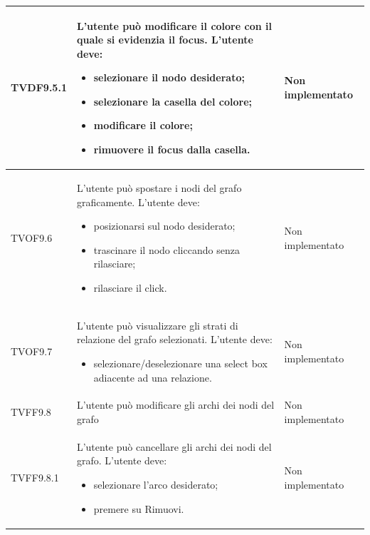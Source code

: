 \documentclass[openany,12pt,a4paper]{report}
\begin{document}
\begin{longtable}{| p{3cm} |p{8cm} | p{2.5cm} |}
	\newline TVDF9.5.1&
	\newline L'utente può modificare il colore con il quale si evidenzia il focus. L'utente deve:
	\begin{itemize}
		\item selezionare il nodo desiderato;
		\item selezionare la casella del colore;
		\item modificare il colore;
		\item rimuovere il focus dalla casella.
	\end{itemize}&
	\newline Non implementato
	\\[1em]
	\hline
	
	\newline TVOF9.6&
	\newline L'utente può spostare i nodi del grafo graficamente. L'utente deve:
	\begin{itemize}
		\item posizionarsi sul nodo desiderato;
		\item trascinare il nodo cliccando senza rilasciare;
		\item rilasciare il click.
	\end{itemize}&
	\newline Non implementato
	\\[1em]
	\hline
	
	\newline TVOF9.7&
	\newline L'utente può visualizzare gli strati di relazione del grafo selezionati. L'utente deve:
	\begin{itemize}
		\item selezionare/deselezionare una select box adiacente ad una relazione.
	\end{itemize}&
	\newline Non implementato
	\\[1em]
	\hline
	
	\newline TVFF9.8&
	\newline L'utente può modificare gli archi dei nodi del grafo&
	\newline Non implementato
	\\[1em]
	\hline
	
	\newline TVFF9.8.1&
	\newline L'utente può cancellare gli archi dei nodi del grafo. L'utente deve:
	\begin{itemize}
		\item selezionare l'arco desiderato;
		\item premere su Rimuovi.
	\end{itemize}&
	\newline Non implementato
	\\[1em]
	\hline
	

\end{longtable}
\end{document}
